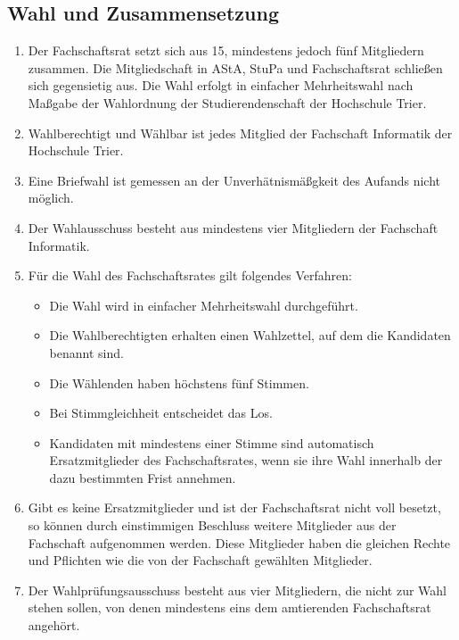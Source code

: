 \subsection{Wahl und Zusammensetzung}
\label{sec:zusammensetzung}
\begin{enumerate}
\item Der Fachschaftsrat setzt sich aus 15, mindestens jedoch fünf Mitgliedern zusammen. Die Mitgliedschaft in AStA, StuPa und Fachschaftsrat schließen sich gegensietig aus. Die Wahl erfolgt in einfacher Mehrheitswahl nach Maßgabe der Wahlordnung der Studierendenschaft der Hochschule Trier.
\item Wahlberechtigt und Wählbar ist jedes Mitglied der Fachschaft Informatik der Hochschule Trier.
\item Eine Briefwahl ist gemessen an der Unverhätnismäßgkeit des Aufands nicht möglich.
\item Der Wahlausschuss besteht aus mindestens vier Mitgliedern der Fachschaft Informatik.
\item Für die Wahl des Fachschaftsrates gilt folgendes Verfahren:
\begin{itemize}
\item Die Wahl wird in einfacher Mehrheitswahl durchgeführt.
\item Die Wahlberechtigten erhalten einen Wahlzettel, auf dem die Kandidaten benannt sind.
\item Die Wählenden haben höchstens fünf Stimmen.
\item Bei Stimmgleichheit entscheidet das Los.
\item Kandidaten mit mindestens einer Stimme sind automatisch Ersatzmitglieder des Fachschaftsrates, wenn sie ihre Wahl innerhalb der dazu bestimmten Frist annehmen.
\end{itemize}
\item \label{ersatz} Gibt es keine Ersatzmitglieder und ist der Fachschaftsrat nicht voll besetzt, so können durch einstimmigen Beschluss weitere Mitglieder aus der Fachschaft aufgenommen werden. Diese Mitglieder haben die gleichen Rechte und Pflichten wie die von der Fachschaft gewählten Mitglieder.
\item Der Wahlprüfungsausschuss besteht aus vier Mitgliedern, die nicht zur Wahl stehen sollen, von denen mindestens eins dem amtierenden Fachschaftsrat angehört.
\end{enumerate}


